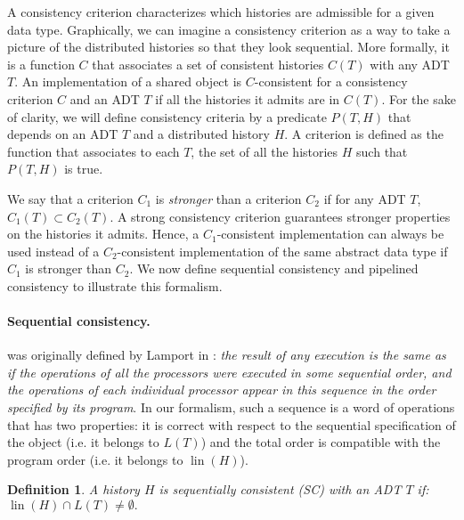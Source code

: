 \documentclass[9pt,numbers]{sigplanconf}
\newtheorem{definition}{Definition}
\DeclareMathOperator{\lin}{lin}
\begin{document}
A consistency criterion characterizes which histories are admissible for a given data type. 
Graphically, we can imagine a consistency criterion as a way to take a picture of the 
distributed histories so that they look sequential.
More formally, it is a function $C$ that associates a set of consistent histories $C(T)$ 
with any ADT $T$. An implementation of a shared object is $C$-consistent for a consistency
criterion $C$ and an ADT $T$ if all the histories it admits are in $C(T)$.
For the sake of clarity, we will define consistency criteria by a predicate $P(T, H)$ 
that depends on an ADT $T$ and a distributed history $H$. A criterion is defined as 
the function that associates to each $T$, the set of all the histories $H$ such that $P(T, H)$ is true.

We say that a criterion $C_1$ is \emph{stronger} than a criterion $C_2$ if for any ADT $T$, 
$C_1(T) \subset C_2(T)$. A strong consistency criterion guarantees stronger properties on the 
histories it admits. Hence, a $C_1$-consistent implementation can always be used instead of a 
$C_2$-consistent implementation of the same abstract data type if $C_1$ is stronger than $C_2$.
We now define sequential consistency \cite{lamport1979make} 
and pipelined consistency \cite{lipton1988pram} to illustrate this formalism.

\paragraph{Sequential consistency.} was originally defined by Lamport 
in \cite{lamport1979make}: {\em the result of any execution is the same as if the operations 
of all the processors were executed in some sequential order, and the operations of each 
individual processor appear in this sequence in the order specified by its program}. 
In our formalism, such a sequence is a word of operations that has two properties:
it is correct with respect to the sequential specification of the object (i.e. it belongs to $L(T)$)
and the total order is compatible with the program order (i.e. it belongs to $\lin(H)$).

\begin{definition}
  A history $H$ is \emph{sequentially consistent} (SC) with an ADT $T$ if: $\lin(H) \cap L(T) \neq \emptyset.$
\end{definition}
\end{document}
